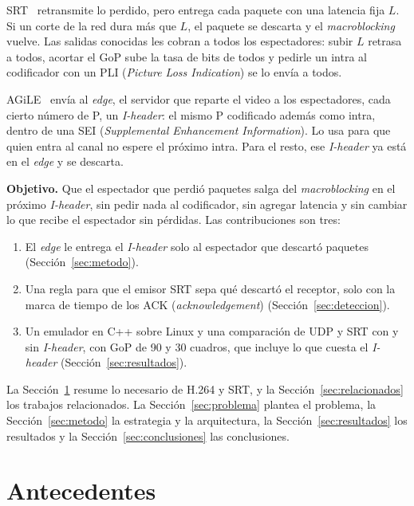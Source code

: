 \documentclass[10pt,twocolumn,letterpaper]{article}
\begin{document}
SRT~\cite{srt} retransmite lo perdido, pero entrega cada paquete con una latencia fija $L$. Si un corte de la red dura más que $L$, el paquete se descarta y el \emph{macroblocking} vuelve. Las salidas conocidas les cobran a todos los espectadores: subir $L$ retrasa a todos, acortar el GoP sube la tasa de bits de todos y pedirle un intra al codificador con un PLI (\emph{Picture Loss Indication}) se lo envía a todos.

AGiLE~\cite{agile} envía al \emph{edge}, el servidor que reparte el video a los espectadores, cada cierto número de P, un \emph{I-header}: el mismo P codificado además como intra, dentro de una SEI (\emph{Supplemental Enhancement Information}). Lo usa para que quien entra al canal no espere el próximo intra. Para el resto, ese \emph{I-header} ya está en el \emph{edge} y se descarta.

\textbf{Objetivo.} Que el espectador que perdió paquetes salga del \emph{macroblocking} en el próximo \emph{I-header}, sin pedir nada al codificador, sin agregar latencia y sin cambiar lo que recibe el espectador sin pérdidas. Las contribuciones son tres:
\begin{enumerate}
\item El \emph{edge} le entrega el \emph{I-header} solo al espectador que descartó paquetes (Sección~\ref{sec:metodo}).
\item Una regla para que el emisor SRT sepa qué descartó el receptor, solo con la marca de tiempo de los ACK (\emph{acknowledgement}) (Sección~\ref{sec:deteccion}).
\item Un emulador en C++ sobre Linux y una comparación de UDP y SRT con y sin \emph{I-header}, con GoP de 90 y 30 cuadros, que incluye lo que cuesta el \emph{I-header} (Sección~\ref{sec:resultados}).
\end{enumerate}
La Sección~\ref{sec:previos} resume lo necesario de H.264 y SRT, y la Sección~\ref{sec:relacionados} los trabajos relacionados. La Sección~\ref{sec:problema} plantea el problema, la Sección~\ref{sec:metodo} la estrategia y la arquitectura, la Sección~\ref{sec:resultados} los resultados y la Sección~\ref{sec:conclusiones} las conclusiones.

\section{Antecedentes}
\label{sec:previos}
\end{document}
